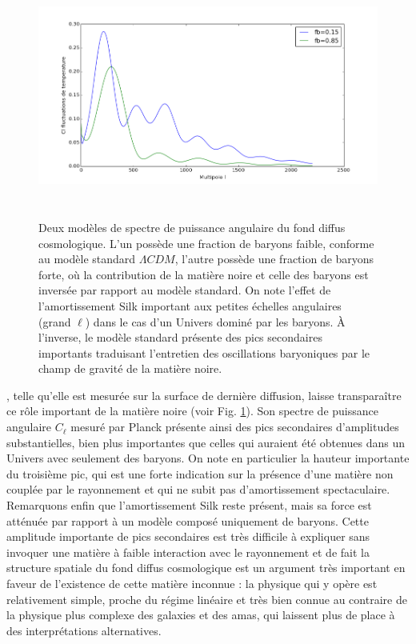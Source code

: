 \begin{figure}[htbp]
	\centering
		\includegraphics[height=8cm]{figs/cl_silk.png}
	\caption[Deux modèles de spectre de puissance angulaire du fond diffus cosmologique]{Deux modèles de spectre de puissance angulaire du fond diffus cosmologique. L'un possède une fraction de baryons faible, conforme au modèle standard $\Lambda CDM$, l'autre possède une fraction de baryons forte, où la contribution de la matière noire et celle des baryons est inversée par rapport au modèle standard. On note l'effet de l'amortissement Silk important aux petites échelles angulaires (grand $\ell$) dans le cas d'un Univers dominé par les baryons. À l'inverse, le modèle standard présente des pics secondaires importants traduisant l'entretien des oscillations baryoniques par le champ de gravité de la matière noire.} 
	\label{f:cl_silk}
\end{figure}

, telle qu'elle est mesurée sur la surface de dernière diffusion, laisse transparaître ce rôle important de la matière noire (voir Fig. \ref{f:cl_silk}). Son spectre de puissance angulaire $C_\ell$ mesuré par Planck présente ainsi des pics secondaires d'amplitudes substantielles, bien plus importantes que celles qui auraient été obtenues dans un Univers avec seulement des baryons. On note en particulier la hauteur importante du troisième pic, qui est une forte indication sur la présence d'une matière non couplée par le rayonnement et qui ne subit pas d'amortissement spectaculaire. Remarquons enfin que l'amortissement Silk reste présent, mais sa force est atténuée par rapport à un modèle composé uniquement de baryons. Cette amplitude importante de pics secondaires est très difficile à expliquer sans invoquer une matière à faible interaction avec le rayonnement et de fait la structure spatiale du fond diffus cosmologique est un argument très important en faveur de l'existence de cette matière inconnue : la physique qui y opère est relativement simple, proche du régime linéaire et très bien connue au contraire de la physique plus complexe des galaxies et des amas, qui laissent plus de place à des interprétations alternatives.

